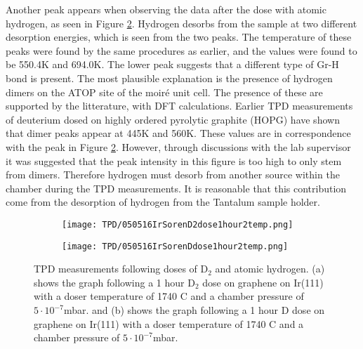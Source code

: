 \begin{table}
  \centering
  \caption{}
  \label{edes}
\end{table}

Another peak appears when observing the data after the dose with atomic hydrogen, as seen in Figure \ref{TPD:D}. Hydrogen desorbs from the sample at two different desorption energies, which is seen from the two peaks. The temperature of these peaks were found by the same procedures as earlier, and the values were found to be 550.4K and 694.0K. The lower peak suggests that a different type of Gr-H bond is present. The most plausible explanation is the presence of hydrogen dimers on the ATOP site of the moiré unit cell. The presence of these are supported by the litterature, with DFT calculations.\cite{balog2013controlling} Earlier TPD measurements of deuterium dosed on highly ordered pyrolytic graphite (HOPG) have shown that dimer peaks appear at 445K and 560K.\cite{hornekaer2006metastable} These values are in correspondence with the peak in Figure \ref{TPD:D}. However, through discussions with the lab supervisor it was suggested that the peak intensity in this figure is too high to only stem from dimers. Therefore hydrogen must desorb from another source within the chamber during the TPD measurements. It is reasonable that this contribution come from the desorption of hydrogen from the Tantalum sample holder.

\begin{figure}
  \centering
  \begin{subfigure}[b]{0.45\textwidth}
    \texttt{[image: TPD/050516IrSorenD2dose1hour2temp.png]}
    \caption{}
    \label{TPD:D2}
  \end{subfigure}\hspace{0.5cm}
  \begin{subfigure}[b]{0.45\textwidth}
    \texttt{[image: TPD/050516IrSorenDdose1hour2temp.png]}
    \caption{}
    \label{TPD:D}
  \end{subfigure}
  \caption{TPD measurements following doses of D$_2$ and atomic hydrogen. (a) shows the graph following a 1 hour D$_2$ dose on graphene on Ir(111) with a doser temperature of 1740 \degree C and a chamber pressure of $5\cdot 10^{-7}$mbar. and (b) shows the graph following a 1 hour D dose on graphene on Ir(111) with a doser temperature of 1740 \degree C and a chamber pressure of $5\cdot 10^{-7}$mbar.}
  \label{TPD:all}
\end{figure}

